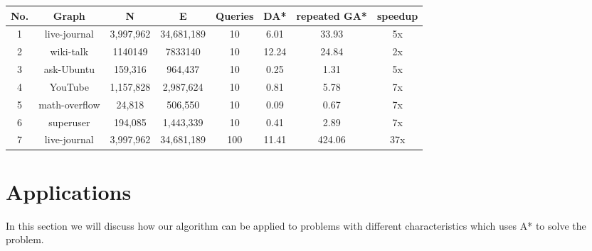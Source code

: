 \documentclass[a4paper]{article}
\begin{document}
 \label{tab:comparison}
\begin{tabular}{ |c|c|c|c|c|c|c|c| } 
 \hline
 No. & Graph & N & E & Queries & DA* & repeated GA* & speedup \\ 
 \hline
 1 & live-journal & 3,997,962 &	34,681,189 & 10	& 6.01 & 33.93 & 5x\\
 \hline
 2 & wiki-talk & 1140149 & 7833140 & 10 & 12.24 & 24.84 & 2x\\
 \hline
 3 & ask-Ubuntu & 159,316 &	964,437 & 10 & 0.25	 & 1.31 & 5x\\
 \hline
 4 & YouTube & 1,157,828 & 2,987,624 & 10 & 0.81 &	5.78 & 7x\\
 \hline
 5 & math-overflow &	24,818	& 506,550	& 10 & 0.09 & 0.67 & 7x\\
 \hline
 6 & superuser & 194,085 & 1,443,339 & 10 &	0.41 & 2.89 & 7x\\
 \hline
 7 & live-journal &	3,997,962 & 34,681,189	& 100 &	11.41 &	424.06  & 37x\\
 \hline
\end{tabular}

\section{Applications}
In this section we will discuss how our algorithm can be applied to problems with different characteristics which uses A* to solve the problem.
\end{document}
